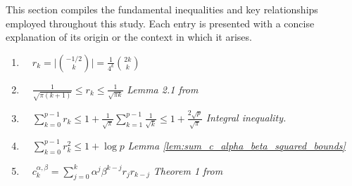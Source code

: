 \documentclass{article} %
\begin{document}
This section compiles the fundamental inequalities and key relationships employed throughout this study. Each entry is presented with a concise explanation of its origin or the context in which it arises.


\begin{enumerate}
    \item $\displaystyle \quad r_k = \bigg|\binom{-1/2}{k}\bigg| = \frac{1}{4^k}\binom{2k}{k}$ \hfill \textit{ \citet{Henzinger}}
    \item $\displaystyle \quad \frac{1}{\sqrt{\pi (k + 1)}} \le r_k \le \frac{1}{\sqrt{\pi k}}$ \hfill \textit{Lemma 2.1 from \citet{dvijotham2024efficient}}
    \item  $\displaystyle \quad \sum\limits_{k = 0}^{p - 1}r_k \le  1 +  \frac{1}{\sqrt{\pi}}\sum\limits_{k = 1}^{p - 1}\frac{1}{\sqrt{k}} \le 1 + \frac{2 \sqrt{p}}{\sqrt{\pi}}$ \hfill \textit{Integral inequality.}
    \item  $\displaystyle \quad \sum\limits_{k = 0}^{p - 1}r^2_k \le 1 + \log p$ 
    \hfill \textit{Lemma \ref{lem:sum_c_alpha_beta_squared_bounds}}
    \item $\displaystyle \quad c_k^{\alpha,\beta} = \sum_{j=0}^{k} \alpha^j \beta^{k-j} r_j r_{k-j}$ \hfill \textit{Theorem 1 from \citet{kalinin2024}}
    

\end{enumerate}
\end{document}
